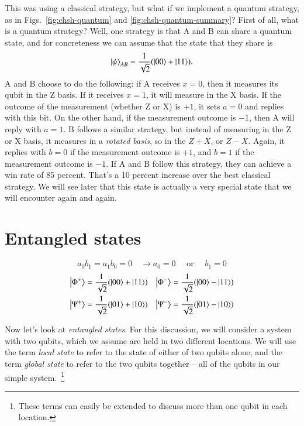 This was using a classical strategy, but what if we implement a quantum strategy, as in Figs.~\ref{fig:chsh-quantum} and \ref{fig:chsh-quantum-summary}? First of all, what is a quantum strategy? Well, one strategy is that A and B can share a quantum state, and for concreteness we can assume that the state that they share is 
\begin{equation}
\left| \psi \right\rangle_{AB} = \frac{1}{\sqrt2}(\left| 00 \right\rangle + \left| 11 \right\rangle).
\end{equation}
A and B choose to do the following: if A receives $x=0$, then it measures its qubit in the Z basis. If it receives $x=1$, it will measure in the X basis. If the outcome of the measurement (whether Z or X) is $+1$, it sets $a=0$ and replies with this bit. On the other hand, if the measurement outcome is $-1$, then A will reply with $a=1$. B follows a similar strategy, but instead of measuring in the Z or X basis, it measures in a \emph{rotated basis}, so in the $Z+X$, or $Z-X$. Again, it replies with $b=0$ if the measurement outcome is $+1$, and $b=1$ if the measurement outcome is $-1$. If A and B follow this strategy, they can achieve a win rate of 85 percent. That's a 10 percent increase over the best classical strategy. We will see later that this state is actually a very special state that we will encounter again and again.

\section{Entangled states}



\begin{equation}
a_{0} b_{1}=a_{1} b_{0}=0 \quad \longrightarrow a_{0}=0 \quad \text { or } \quad b_{1}=0
\end{equation}
\begin{equation}
\begin{aligned}
\left| \Phi^{+} \right\rangle&=\frac{1}{\sqrt{2}}(|00\rangle+|11\rangle) &\left|\Phi^{-}\right\rangle=\frac{1}{\sqrt{2}}(|00\rangle-|11\rangle) \\
\left| \Psi^{+} \right\rangle&=\frac{1}{\sqrt{2}}(|01\rangle+|10\rangle) &\left|\Psi^{-}\right\rangle=\frac{1}{\sqrt{2}}(|01\rangle-|10\rangle)
\end{aligned}
\end{equation}
\fi


Now let's look at \emph{entangled states}.  For this discussion, we will consider a system with two qubits, which we assume are held in two different locations.  We will use the term \emph{local state} to refer to the state of either of two qubits alone, and the term \emph{global state} to refer to the two qubits together -- all of the qubits in our simple system.~\footnote{These terms can easily be extended to discuss more than one qubit in each location.}

